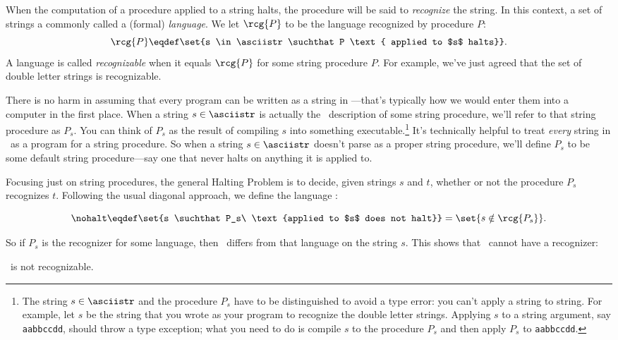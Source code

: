 When the computation of a procedure applied to a string halts, the
procedure will be said to \emph{recognize} the string.  In this
context, a set of strings a commonly called a (formal)
\emph{language}.  We let $\rcg{P}$ to be the language recognized by
procedure $P$:
\[
\rcg{P} \eqdef \set{s \in \asciistr \suchthat P \text{ applied to $s$
  halts}}.
\]
A language is called \emph{recognizable} when it equals $\rcg{P}$ for
some string procedure $P$.  For example, we've just agreed that the
set of double letter strings is recognizable.

There is no harm in assuming that every program can be written as a
string in \asciistr---that's typically how we would enter them into a
computer in the first place.  When a string $s \in \asciistr$ is
actually the \asciibet\ description of some string procedure, we'll
refer to that string procedure as $P_s$.  You can think of $P_s$ as
the result of compiling $s$ into something executable.\footnote{The
  string $s \in \asciistr$ and the procedure $P_s$ have to be
  distinguished to avoid a type error: you can't apply a string to
  string.  For example, let $s$ be the string that you wrote as your
  program to recognize the double letter strings.  Applying $s$ to a
  string argument, say \texttt{aabbccdd}, should throw a type
  exception; what you need to do is compile $s$ to the procedure $P_s$
  and then apply $P_s$ to \texttt{aabbccdd}.} It's technically helpful
to treat \emph{every} string in \asciistr\ as a program for a string
procedure.  So when a string $s \in \asciistr$ doesn't parse as a
proper string procedure, we'll define $P_s$ to be some default string
procedure---say one that never halts on anything it is applied to.

Focusing just on string procedures, the general Halting Problem is to
decide, given strings $s$ and $t$, whether or not the procedure $P_s$
recognizes $t$.  Following the usual diagonal approach, we define the language \nohalt:
\begin{definition}\label{nohalt_def}
\begin{equation}\label{nohalt_eqdef}
\nohalt \eqdef \set{s \suchthat P_s\ \text{applied to $s$ does not halt}} = \set{s \notin \rcg{P_s}}.
\end{equation}
\end{definition}
So if $P_s$ is the recognizer for some language, then \nohalt\ differs
from that language on the string $s$.  This shows that \nohalt\ cannot
have a recognizer:
\begin{theorem}\label{nohalt_thm}
\nohalt\ is not recognizable.
\end{theorem}

